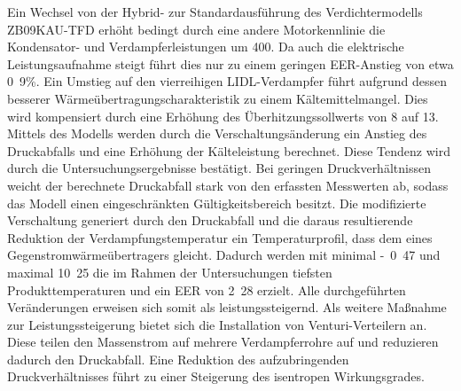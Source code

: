 Ein Wechsel von der Hybrid- zur Standardausführung des Verdichtermodells ZB09KAU-TFD erhöht bedingt durch eine andere Motorkennlinie die Kondensator- und Verdampferleistungen um \unit{400}{\watt}. Da auch die elektrische Leistungsaufnahme steigt führt dies nur zu einem geringen EER-Anstieg von etwa \unit{0.9}{\%}.\newline
Ein Umstieg auf den vierreihigen LIDL-Verdampfer führt aufgrund dessen besserer Wärmeübertragungscharakteristik zu einem Kältemittelmangel. Dies wird kompensiert durch eine Erhöhung des Überhitzungssollwerts von \unit{8}{\kelvin} auf \unit{13}{\kelvin}. \newline
Mittels des Modells werden durch die Verschaltungsänderung ein Anstieg des Druckabfalls und eine Erhöhung der Kälteleistung berechnet. Diese Tendenz wird durch die Untersuchungsergebnisse bestätigt. Bei geringen Druckverhältnissen weicht der berechnete Druckabfall stark von den erfassten Messwerten ab, sodass das Modell einen eingeschränkten Gültigkeitsbereich besitzt. Die modifizierte Verschaltung generiert durch den Druckabfall und die daraus resultierende Reduktion der Verdampfungstemperatur ein Temperaturprofil, dass dem eines Gegenstromwärmeübertragers gleicht. Dadurch werden mit minimal \unit{-0.47}{\celsius}  und maximal \unit{10.25}{\celsius} die im Rahmen der Untersuchungen tiefsten Produkttemperaturen und ein EER von \unit{2.28}{} erzielt.
Alle durchgeführten Veränderungen erweisen sich somit als leistungssteigernd. \newline
Als weitere Maßnahme zur Leistungssteigerung bietet sich die Installation von Venturi-Verteilern an. Diese teilen den Massenstrom auf mehrere Verdampferrohre auf und reduzieren dadurch den Druckabfall. Eine Reduktion des aufzubringenden Druckverhältnisses führt zu einer Steigerung des isentropen Wirkungsgrades.


